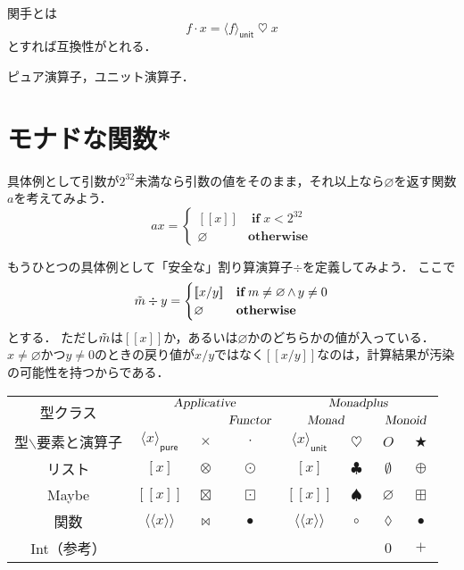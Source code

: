 \documentclass[twocolumn]{jsbook}
\def\[{[\![}
\def\]{]\!]}
\newcommand{\hsklTypeclass}[1]{\textsl{#1}}
\DeclareMathOperator{\hsklApplicativeMap}{\times}
\DeclareMathOperator{\hsklApplicativeListMap}{\otimes}
\DeclareMathOperator{\hsklApplicativeMaybeMap}{\boxtimes}
\DeclareMathOperator{\hsklFmap}{\cdot}
\DeclareMathOperator{\hsklMap}{\odot}
\DeclareMathOperator{\hsklMaybeAppend}{\boxplus}
\DeclareMathOperator{\hsklMaybeMap}{\boxdot}
\DeclareMathOperator{\hsklMonadMap}{\heartsuit}
\newcommand{\hsklAppend}{\oplus}
\newcommand{\hsklApplicative}{\hsklTypeclass{Applicative}}
\newcommand{\hsklEmptyList}{\emptyset}
\newcommand{\hsklFunctor}{\hsklTypeclass{Functor}}
\newcommand{\hsklMonad}{\hsklTypeclass{Monad}}
\newcommand{\hsklMonadplus}{\hsklTypeclass{Monadplus}}
\newcommand{\hsklMonoid}{\hsklTypeclass{Monoid}}
\newcommand{\hsklNothing}{\varnothing}
\newcommand{\hsklJust}[1]{\[#1\]}
\newcommand{\hsklMaybe}[1]{\Tilde{#1}}
\newcommand{\hsklPure}[1]{\langle#1\rangle_\textsf{pure}}
\newcommand{\hsklUnit}[1]{\langle#1\rangle_\textsf{unit}}
\newcommand{\mathKeyword}[1]{\mathbf{#1}}
\DeclareMathOperator{\mathAnyBinaryOperator}{\bigstar}
\DeclareMathOperator{\mathAnd}{\wedge}
\DeclareMathOperator{\mathCompose}{\bullet}
\DeclareMathOperator{\mathIf}{\mathKeyword{if}}
\newcommand{\mathLambdaAnonymousParameter}{\lozenge}
\newcommand{\mathOtherwise}{\mathKeyword{otherwise}}
\begin{document}
関手とは
$$f\hsklFmap x=\hsklUnit{f}\hsklMonadMap x$$
とすれば互換性がとれる．


ピュア演算子，ユニット演算子．


\section{モナドな関数*}


具体例として引数が$2^{32}$未満なら引数の値をそのまま，それ以上なら$\hsklNothing$を返す関数$a$を考えてみよう．
\begin{equation*}
ax=\begin{cases}
\hsklJust{x}&\mathIf x<2^{32}\\
\hsklNothing&\mathOtherwise
\end{cases}
\end{equation*}


もうひとつの具体例として「安全な」割り算演算子$\div$を定義してみよう．
ここで
\begin{equation*}
\hsklMaybe{m}\div y=\begin{cases}\hsklJust{x/y}&\mathIf m\neq\hsklNothing\mathAnd y\neq0\\
\hsklNothing&\mathOtherwise\end{cases}
\end{equation*}
とする．
ただし$\hsklMaybe{m}$は$\hsklJust{x}$か，あるいは$\hsklNothing$かのどちらかの値が入っている．
$x\neq\hsklNothing$かつ$y\neq0$のときの戻り値が$x/y$ではなく$\hsklJust{x/y}$なのは，計算結果が汚染の可能性を持つからである．


\begin{table*}
\begin{center}
\begin{tabular}{||c||c|c|c|c|c|c|c||}
\hline
\multirow{2}{*}{型クラス}
    &\multicolumn{3}{|c|}{$\hsklApplicative$}
    &\multicolumn{4}{|c||}{$\hsklMonadplus$}\\
\cline{4-8}
\multirow{1}{*}{}
    &\multicolumn{2}{|c|}{ }
    &$\hsklFunctor$
    &\multicolumn{2}{|c}{$\hsklMonad$}
    &\multicolumn{2}{|c||}{$\hsklMonoid$}\\
\hline\hline
型$\backslash$要素と演算子
    &$\hsklPure{x}$
    &$\hsklApplicativeMap$
    &$\hsklFmap$
    &$\hsklUnit{x}$
    &$\hsklMonadMap$
    &$O$
    &$\mathAnyBinaryOperator$\\
\hline
リスト
    &$[x]$
    &$\hsklApplicativeListMap$
    &$\hsklMap$
    &$[x]$
    &$\clubsuit$
    &$\hsklEmptyList$
    &$\hsklAppend$\\
\hline
Maybe
    &$\hsklJust{x}$
    &$\hsklApplicativeMaybeMap$
    &$\hsklMaybeMap$
    &$\hsklJust{x}$
    &$\spadesuit$
    &$\hsklNothing$
    &$\hsklMaybeAppend$\\
\hline
関数
    &$\langle\!\langle x\rangle\!\rangle$
    &$\bowtie$
    &$\mathCompose$
    &$\langle\!\langle x\rangle\!\rangle$
    &$\circ$
    &$\mathLambdaAnonymousParameter$
    &$\mathCompose$\\
\hline
Int（参考）
    &
    &
    &
    &
    &
    &$0$
    &$+$\\
\hline
\end{tabular}
\end{center}
\end{table*}
\end{document}
